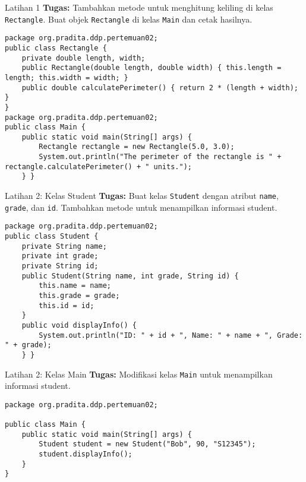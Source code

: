 \documentclass[aspectratio=169, table]{beamer}
\begin{document}
\begin{frame}[fragile]{Latihan 1}
\vspace{15pt}
\textbf{Tugas:} Tambahkan metode untuk menghitung keliling di kelas \texttt{Rectangle}. Buat objek \texttt{Rectangle} di kelas \texttt{Main} dan cetak hasilnya.
\begin{lstlisting}[style=JavaStyle]
package org.pradita.ddp.pertemuan02;
public class Rectangle {
	private double length, width;
	public Rectangle(double length, double width) { this.length = length; this.width = width; }
	public double calculatePerimeter() { return 2 * (length + width); }
}
package org.pradita.ddp.pertemuan02;
public class Main {
	public static void main(String[] args) {
		Rectangle rectangle = new Rectangle(5.0, 3.0);
		System.out.println("The perimeter of the rectangle is " + rectangle.calculatePerimeter() + " units.");
	} }
\end{lstlisting}
\end{frame}

\begin{frame}[fragile]{Latihan 2: Kelas Student}
\vspace{15pt}
\textbf{Tugas:} Buat kelas \texttt{Student} dengan atribut \texttt{name}, \texttt{grade}, dan \texttt{id}. Tambahkan metode untuk menampilkan informasi student.
\begin{lstlisting}[style=JavaStyle]
package org.pradita.ddp.pertemuan02;
public class Student {
	private String name;
	private int grade;
	private String id;
	public Student(String name, int grade, String id) {
		this.name = name;
		this.grade = grade;
		this.id = id;
	}
	public void displayInfo() {
		System.out.println("ID: " + id + ", Name: " + name + ", Grade: " + grade);
	} }
\end{lstlisting}
\end{frame}

\begin{frame}[fragile]{Latihan 2: Kelas Main}
\vspace{15pt}
\textbf{Tugas:} Modifikasi kelas \texttt{Main} untuk menampilkan informasi student.
\begin{lstlisting}[style=JavaStyle]
package org.pradita.ddp.pertemuan02;

public class Main {
	public static void main(String[] args) {
		Student student = new Student("Bob", 90, "S12345");
		student.displayInfo();
	}
}
\end{lstlisting}
\end{frame}
\end{document}
